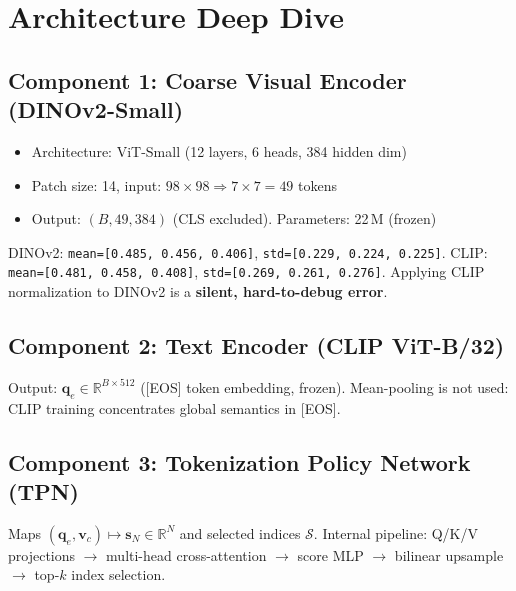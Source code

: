 \documentclass[11pt,a4paper]{article}
\newcommand{\R}{\mathbb{R}}
\newcommand{\vc}{\mathbf{v}_c}
\newcommand{\qe}{\mathbf{q}_e}
\newcommand{\vs}{\mathbf{s}}
\begin{document}
\section{Architecture Deep Dive}
\label{sec:architecture}

\subsection{Component 1: Coarse Visual Encoder (DINOv2-Small)}

\begin{itemize}[leftmargin=1.5em, itemsep=1pt]
  \item Architecture: ViT-Small (12 layers, 6 heads, 384 hidden dim)
  \item Patch size: 14, input: $98{\times}98 \Rightarrow 7{\times}7 = 49$ tokens
  \item Output: $(B, 49, 384)$ (CLS excluded). Parameters: 22\,M (frozen)
\end{itemize}

\begin{warnbox}[title={Critical Normalization Warning}]
DINOv2: \texttt{mean=[0.485, 0.456, 0.406]}, \texttt{std=[0.229, 0.224, 0.225]}.
CLIP:    \texttt{mean=[0.481, 0.458, 0.408]}, \texttt{std=[0.269, 0.261, 0.276]}.
Applying CLIP normalization to DINOv2 is a \textbf{silent, hard-to-debug error}.
\end{warnbox}

\subsection{Component 2: Text Encoder (CLIP ViT-B/32)}

Output: $\qe \in \R^{B \times 512}$ ([EOS] token embedding, frozen).
Mean-pooling is not used: CLIP training concentrates global semantics in [EOS].

\subsection{Component 3: Tokenization Policy Network (TPN)}

Maps $(\qe, \vc) \mapsto \vs_N \in \R^N$ and selected indices $\mathcal{S}$.
Internal pipeline: Q/K/V projections $\to$ multi-head cross-attention
$\to$ score MLP $\to$ bilinear upsample $\to$ top-$k$ index selection.
\end{document}
